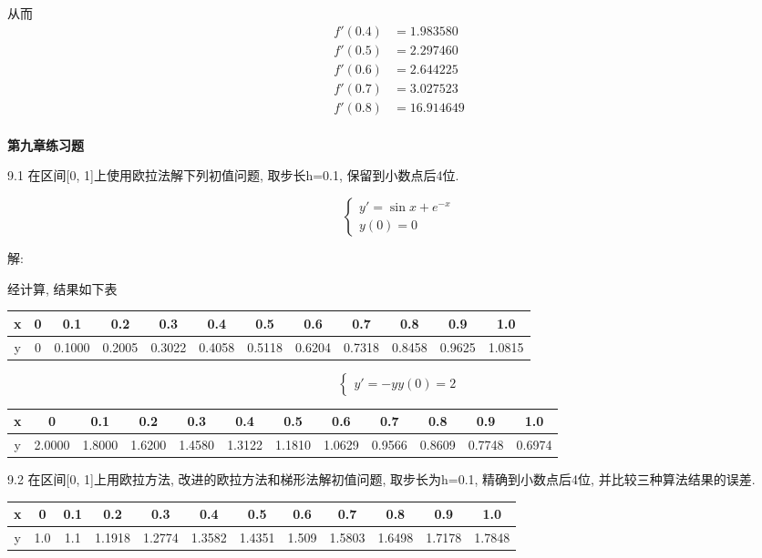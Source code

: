 \documentclass[a4paper, 10pt]{article}
\begin{document}
\begin{CJK}{UTF8}{gbsn}
从而 \\

\begin{align*}
	f'(0.4) & =  1.983580 \\
	f'(0.5) & =  2.297460 \\
	f'(0.6) & =  2.644225 \\
	f'(0.7) & =  3.027523 \\
	f'(0.8) & = 16.914649 \\
\end{align*}

\textbf{第九章练习题}

9.1
在区间[0, 1]上使用欧拉法解下列初值问题, 取步长h=0.1, 保留到小数点后4位.

\begin{equation*}
	\begin{cases}
		y' = \sin{x}+e^{-x} \\
		y(0) = 0
	\end{cases}
\end{equation*}

解:

经计算, 结果如下表

\begin{table}[h]
	\centering
	\begin{tabular}{c|c c c c c c c c c c c}
		\hline
		x & 0 & 0.1 & 0.2 & 0.3 & 0.4 & 0.5 & 0.6 & 0.7 & 0.8 & 0.9 & 1.0 \\
		\hline
		y & 0 & 0.1000 & 0.2005 & 0.3022 & 0.4058 & 0.5118 & 0.6204 & 0.7318 & 0.8458 & 0.9625 & 1.0815 \\
		\hline
	\end{tabular}
\end{table}
\begin{equation*}
	\begin{cases}
		y' = -y
		y(0) = 2
	\end{cases}
\end{equation*}
\begin{table}[h]
	\begin{tabular}{c|c c c c c c c c c c c}
		\hline
		x & 0 & 0.1 & 0.2 & 0.3 & 0.4 & 0.5 & 0.6 & 0.7 & 0.8 & 0.9 & 1.0 \\
		\hline
		y & 2.0000 & 1.8000 & 1.6200 & 1.4580 & 1.3122 & 1.1810 & 1.0629 & 0.9566 & 0.8609 & 0.7748 & 0.6974 \\
		\hline
	\end{tabular}
\end{table}

9.2
在区间[0, 1]上用欧拉方法, 改进的欧拉方法和梯形法解初值问题, 取步长为h=0.1, 精确到小数点后4位, 并比较三种算法结果的误差. \\
\begin{table}[h]
	\begin{tabular}{c | c c c c c c c c c c c}
		\hline
		x & 0 & 0.1 & 0.2 & 0.3 & 0.4 & 0.5 & 0.6 & 0.7 & 0.8 & 0.9 & 1.0 \\ 
		\hline
		y & 1.0 & 1.1 & 1.1918 & 1.2774 & 1.3582 & 1.4351 & 1.509 & 1.5803 & 1.6498 & 1.7178 & 1.7848 \\
		\hline
	\end{tabular}
\end{table}


\end{CJK}
\end{document}
